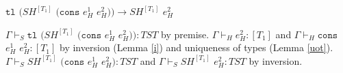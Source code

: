 \begin{case}
$\mathtt{tl}$ $(SH^{[T_{1}]}$ $(\mathtt{cons}$ $e_{H}^{1}$ $e_{H}^{2}))\rightarrow SH^{[T_{1}]}$ $e_{H}^{2}$

$\Gamma\vdash_{S}\mathtt{tl}$ $(SH^{[T_{1}]}$ $(\mathtt{cons}$ $e_{H}^{1}$ $e_{H}^{2})):TST$ by premise.  $\Gamma\vdash_{H}e_{H}^{2}:[T_{1}]$ and $\Gamma\vdash_{H}\mathtt{cons}$ $e_{H}^{1}$ $e_{H}^{2}:[T_{1}]$ by inversion (Lemma \ref{i}) and uniqueness of types (Lemma \ref{uot}).  $\Gamma\vdash_{S}SH^{[T_{1}]}$ $(\mathtt{cons}$ $e_{H}^{1}$ $e_{H}^{2}):TST$ and $\Gamma\vdash_{S}SH^{[T_{1}]}$ $e_{H}^{2}:TST$ by inversion.
\end{case}